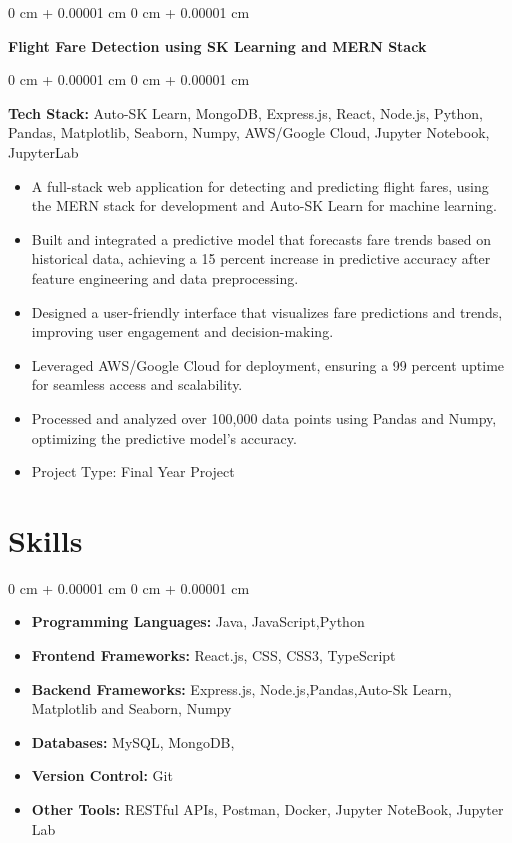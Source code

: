 \documentclass[10pt, letterpaper]{article}
\newenvironment{highlights}{
    \begin{itemize}[
        topsep=0.10 cm,
        parsep=0.10 cm,
        partopsep=0pt,
        itemsep=0pt,
        leftmargin=0 cm + 10pt
    ]
}{
    \end{itemize}
} %
\newenvironment{onecolentry}{
    \begin{adjustwidth}{
        0 cm + 0.00001 cm
    }{
        0 cm + 0.00001 cm
    }
}{
    \end{adjustwidth}
} %
\newenvironment{twocolentry}[2][]{
    \onecolentry
    \def\secondColumn{#2}
    \setcolumnwidth{\fill, 4.5 cm}
    \begin{paracol}{2}
}{
    \switchcolumn \raggedleft \secondColumn
    \end{paracol}
    \endonecolentry
} %
\begin{document}
\vspace{0.2 cm}

 \begin{twocolentry}{
    }
        \textbf{Flight Fare Detection using SK Learning and MERN Stack }
    \end{twocolentry}

\vspace{0.10 cm}
\begin{onecolentry}
    \textbf{Tech Stack:} Auto-SK Learn, MongoDB, Express.js, React, Node.js, Python, Pandas, Matplotlib, Seaborn, Numpy, AWS/Google Cloud, Jupyter Notebook, JupyterLab

    \begin{highlights}
        \item A full-stack web application for detecting and predicting flight fares, using the MERN stack for development and Auto-SK Learn for machine learning.
        \item Built and integrated a predictive model that forecasts fare trends based on historical data, achieving a 15 percent increase in predictive accuracy after feature engineering and data preprocessing.
        \item Designed a user-friendly interface that visualizes fare predictions and trends, improving user engagement and decision-making.
        \item Leveraged AWS/Google Cloud for deployment, ensuring a 99 percent uptime for seamless access and scalability.
        \item Processed and analyzed over 100,000 data points using Pandas and Numpy, optimizing the predictive model’s accuracy.
        \item Project Type: Final Year Project
    \end{highlights}
\end{onecolentry}

    \section{Skills}
    \begin{onecolentry}
        \begin{itemize}
            \item \textbf{Programming Languages:} Java, JavaScript,Python
            \item \textbf{Frontend Frameworks:} React.js, CSS, CSS3, TypeScript
            \item \textbf{Backend Frameworks:} Express.js, Node.js,Pandas,Auto-Sk Learn, Matplotlib and Seaborn, Numpy
            \item \textbf{Databases:} MySQL, MongoDB,  
            \item \textbf{Version Control:} Git
            \item \textbf{Other Tools:} RESTful APIs, Postman, Docker, Jupyter NoteBook, Jupyter Lab
            
        \end{itemize}
    \end{onecolentry}
\end{document}
